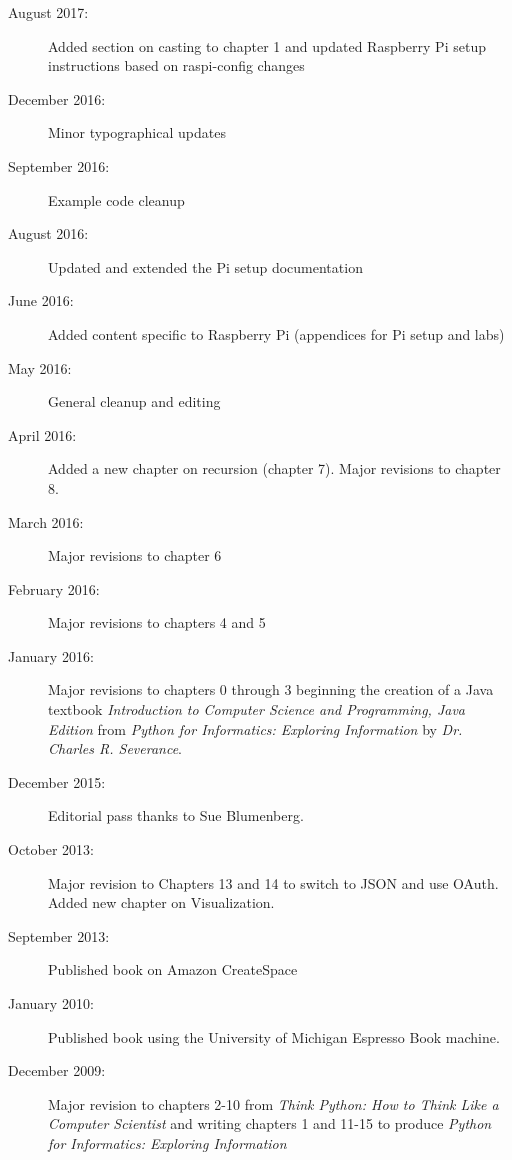 \begin{latexonly}
{\begin{description}
\item[August 2017:] Added section on casting to chapter 1 and updated Raspberry Pi setup instructions based on raspi-config changes
	
\item[December 2016:] Minor typographical updates

\item[September 2016:] Example code cleanup

\item[August 2016:] Updated and extended the Pi setup documentation

\item[June 2016:] Added content specific to Raspberry Pi (appendices for Pi setup and labs)

\item[May 2016:] General cleanup and editing

\item[April 2016:] Added a new chapter on recursion (chapter 7). Major revisions to chapter 8.

\item[March 2016:] Major revisions to chapter 6

\item[February 2016:] Major revisions to chapters 4 and 5

\item[January 2016:] Major revisions to chapters 0 through 3 beginning the creation of a Java textbook \emph{Introduction to Computer Science and Programming, Java Edition} from \emph{Python for Informatics: Exploring Information} by \emph{Dr. Charles R. Severance}.

\item[December 2015:] Editorial pass thanks to Sue Blumenberg.

\item[October 2013:] Major revision to Chapters 13 and 14
to switch to JSON and use OAuth.
Added new chapter on Visualization.

\item[September 2013:] Published book on Amazon CreateSpace

\item[January 2010:] Published book using the University of 
Michigan Espresso Book machine.

\item[December 2009:] Major revision to chapters 2-10 from
\emph{Think Python: How to Think Like
a Computer Scientist}
and writing chapters 1 and 11-15 to
produce 
\emph{Python for Informatics: Exploring Information}


\end{description}}
\end{latexonly}
